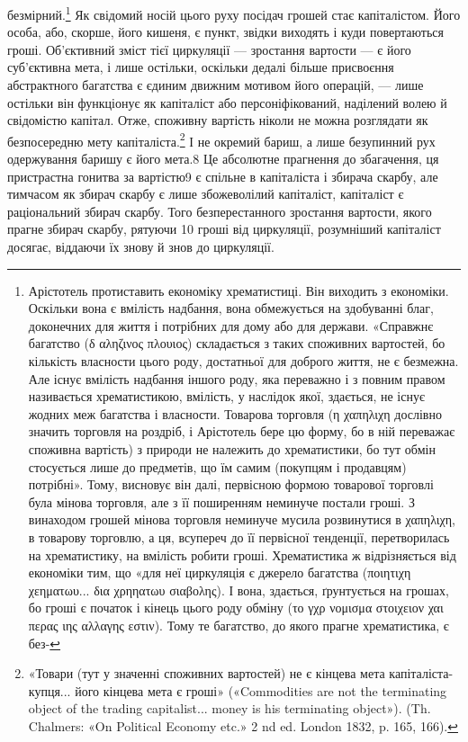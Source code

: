 безмірний.\footnote{
Арістотель протиставить економіку хрематистиці. Він виходить
з економіки. Оскільки вона є вмілість надбання, вона обмежується на здобуванні
благ, доконечних для життя і потрібних для дому або для держави.
«Справжнє багатство (δ αληζινος πλουιος) складається з таких споживних
вартостей, бо кількість власности цього роду, достатньої для
доброго життя, не є безмежна. Але існує вмілість надбання іншого роду,
яка переважно і з повним правом називається хрематистикою, вмілість,
у наслідок якої, здається, не існує жодних меж багатства і власности.
Товарова торговля (η χαπηλιχη    дослівно значить торговля на роздріб,
і Арістотель бере цю форму, бо в ній переважає споживна вартість) з природи
не належить до хрематистики, бо тут обмін стосується лише до предметів,
що їм самим (покупцям і продавцям) потрібні». Тому, висновує
він далі, первісною формою товарової торговлі була мінова торговля,
але з її поширенням неминуче постали гроші. З винаходом грошей мінова
торговля неминуче мусила розвинутися в χαπηλιχη, в товарову торговлю,
а ця, всупереч до її первісної тенденції, перетворилась на хрематистику,
на вмілість робити гроші. Хрематистика ж відрізняється від економіки
тим, що «для неї циркуляція є джерело багатства (ποιητιχη χεηματωυ... δια χρηηατωυ σιαβολης). І
вона, здається, ґрунтується на грошах, бо гроші є початок і кінець цього роду обміну (το γχρ νομισμα
στοιχειον χαι περας ιης αλλαγης εστιν). Тому те багатство, до якого прагне хрематистика, є без-
}
Як свідомий носій цього руху посідач грошей стає капіталістом.
Його особа, або, скорше, його кишеня, є пункт, звідки виходять
і куди повертаються гроші. Об’єктивний зміст тієї циркуляції
— зростання вартости — є його суб’єктивна мета, і лише
остільки, оскільки дедалі більше присвоєння абстрактного багатства
є єдиним движним мотивом його операцій, — лише остільки
він функціонує як капіталіст або персоніфікований, наділений
волею й свідомістю капітал. Отже, споживну вартість ніколи не
можна розглядати як безпосередню мету капіталіста.\footnote{
«Товари (тут у значенні споживних вартостей) не є кінцева мета
капіталіста-купця... його кінцева мета є гроші» («Commodities are
not the terminating object of the trading capitalist... money is his terminating
object»). (Th. Chalmers: «On Political Economy etc.» 2 nd ed. London
1832, p. 165, 166).
} І не окремий
бариш, а лише безупинний рух одержування баришу є його
мета.8 Це абсолютне прагнення до збагачення, ця пристрастна
гонитва за вартістю9 є спільне в капіталіста і збирача скарбу,
але тимчасом як збирач скарбу є лише збожеволілий капіталіст,
капіталіст є раціональний збирач скарбу. Того безперестанного
зростання вартости, якого прагне збирач скарбу, рятуючи 10  гроші
від циркуляції, розумніший капіталіст досягає, віддаючи їх знову
й знов до циркуляції.

